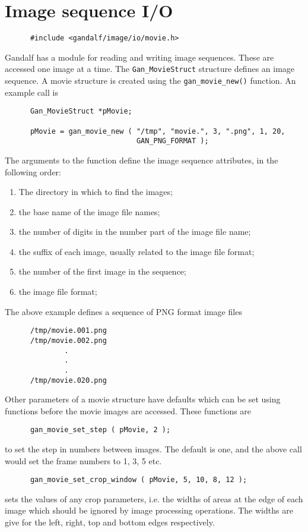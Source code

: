 \section{Image sequence I/O}
\begin{verbatim}
      #include <gandalf/image/io/movie.h>
\end{verbatim}
Gandalf has a module for reading and writing image sequences.
These are accessed one image at a time. The {\tt Gan\_MovieStruct}
structure defines an image sequence.
A movie structure is created using the {\tt gan\_movie\_new()} function.
An example call is
\begin{verbatim}
      Gan_MovieStruct *pMovie;

      pMovie = gan_movie_new ( "/tmp", "movie.", 3, ".png", 1, 20,
                               GAN_PNG_FORMAT );
\end{verbatim}
The arguments to the function define the image sequence attributes,
in the following order:
\begin{enumerate}
  \item The directory in which to find the images;
  \item the base name of the image file names;
  \item the number of digits in the number part of the image file name;
  \item the suffix of each image, usually related to the image file format;
  \item the number of the first image in the sequence;
  \item the image file format;
\end{enumerate}
The above example defines a sequence of PNG format image files
\begin{verbatim}
      /tmp/movie.001.png
      /tmp/movie.002.png
              .
              .
              .
      /tmp/movie.020.png
\end{verbatim}

Other parameters of a movie structure have defaults which can be set using
functions before the movie images are accessed. These functions are
\begin{verbatim}
      gan_movie_set_step ( pMovie, 2 );
\end{verbatim}
to set the step in numbers between images. The default is one, and the above
call would set the frame numbers to 1, 3, 5 etc.
\begin{verbatim}
      gan_movie_set_crop_window ( pMovie, 5, 10, 8, 12 );
\end{verbatim}
sets the values of any crop parameters, i.e. the widths of areas at the edge
of each image which should be ignored by image processing operations.
The widths are give for the left, right, top and bottom edges respectively.

